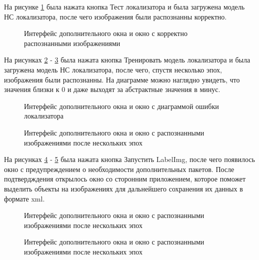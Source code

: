 На рисунке \ref{systemtest19:image} была нажата кнопка Тест локализатора и была загружена модель НС локализатора, после чего изображения были распознанны корректно.

\begin{figure}[H]
\caption{Интерфейс дополнительного окна и окно с корректно распознанными изображениями}
\label{systemtest19:image}
\end{figure}

На рисунках \ref{systemtest20:image} - \ref{systemtest21:image}  была нажата кнопка Тренировать модель локализатора и была загружена модель НС локализатора, после чего, спустя несколько эпох, изображения были распознанны. На диаграмме можно наглядно увидеть, что значения близки к 0 и даже выходят за абстрактные значения в минус.

\begin{figure}[H]
\caption{Интерфейс дополнительного окна и окно с диаграммой ошибки локализатора}
\label{systemtest20:image}
\end{figure}

\begin{figure}[H]
\caption{Интерфейс дополнительного окна и окно с распознанными изображениями после нескольких эпох}
\label{systemtest21:image}
\end{figure}

На рисунках \ref{systemtestlabelimg2:image} - \ref{systemtestlabelimg1:image}  была нажата кнопка Запустить LabelImg, после чего появилось окно с предупреждением о необходимости дополнительных пакетов. После подтвердждения открылось окно со сторонним приложением, которое поможет выделить объекты на изображениях для дальнейшего сохранения их данных в формате xml.

\begin{figure}[H]
\caption{Интерфейс дополнительного окна и окно с распознанными изображениями после нескольких эпох}
\label{systemtestlabelimg2:image}
\end{figure}

\begin{figure}[H]
\caption{Интерфейс дополнительного окна и окно с распознанными изображениями после нескольких эпох}
\label{systemtestlabelimg1:image}
\end{figure}
